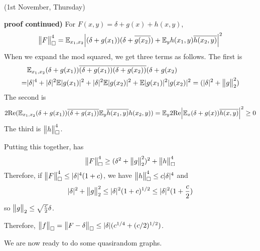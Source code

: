 \documentclass[10pt,a4paper]{report}
\newenvironment{proof}
{\begin{changemargin}{1cm}{0.5cm}
	}%
	{\end{changemargin}
}
\begin{document}
\newday

(1st November, Thursday)
\s

\begin{proof}
\textbf{proof continued)} For $F(x,y) = \delta + g(x) + h(x,y)$,
\begin{align*}
\bigl\lVert F\bigr\rVert_{\tiny{\square}}^4 =  \mathbb{E}_{x_1,x_2} \Big| (\delta + g(x_1))(\delta + \overline{g(x_2)}) + \mathbb{E}_y h(x_1,y) \overline{h(x_2,y)} \Big|^2
\end{align*}
When we expand the mod squared, we get three terms as follows. The first is
\begin{align*}
& \mathbb{E}_{x_1, x_2} (\delta + g(x_1)) \overline{(\delta + g(x_1))} \overline{(\delta + g(x_2))} (\delta + g(x_2) \\
=& |\delta|^4 + |\delta|^2 \mathbb{E} |g(x_1)|^2 + |\delta|^2 \mathbb{E} |g(x_2)|^2 + \mathbb{E} |g(x_1)|^2 |g(x_2)|^2 = (|\delta|^2 + \bigl\lVert g\bigr\rVert_{2}^2)
\end{align*}
The second is
\begin{align*}
2 \text{Re}(\mathbb{E}_{x_1,x_2} (\delta + g(x_1)) \overline{(\delta + g(x_1))} \mathbb{E}_y \overline{h(x_1,y)} h(x_2,y)) = \mathbb{E}_y 2\text{Re} \Big| \mathbb{E}_x (\delta + g(x)) \overline{h(x,y)} \Big|^2 \geq 0
\end{align*}
The third is $\bigl\lVert h\bigr\rVert_{\tiny{\square}}^4$.

\quad Putting this together, has
\begin{align*}
\bigl\lVert F\bigr\rVert_{\tiny{\square}}^4 \geq (\delta^2 + \bigl\lVert g\bigr\rVert_{2}^2)^2 + \bigl\lVert h\bigr\rVert_{\tiny{\square}}^4
\end{align*}
Therefore, if $\bigl\lVert F\bigr\rVert_{\tiny{\square}}^4 \leq |\delta|^4 (1+c)$, we have $\bigl\lVert h\bigr\rVert_{\tiny{\square}}^4 \leq c|\delta|^4$ and
\begin{align*}
|\delta|^2 + \bigl\lVert g\bigr\rVert_{2}^2 \leq |\delta|^2 (1+c)^{1/2} \leq |\delta|^2 (1+ \frac{c}{2})
\end{align*}
so $\bigl\lVert g\bigr\rVert_{2} \leq \sqrt{\frac{c}{2}}\delta$.

\quad Therefore, $\bigl\lVert f\bigr\rVert_{\tiny{\square}} = \bigl\lVert F-\delta\bigr\rVert_{\tiny{\square}} \leq |\delta| (c^{1/4} + (c/2)^{1/2})$.

\eop
\end{proof}
\s

We are now ready to do some quasirandom graphs.
\s
\end{document}
